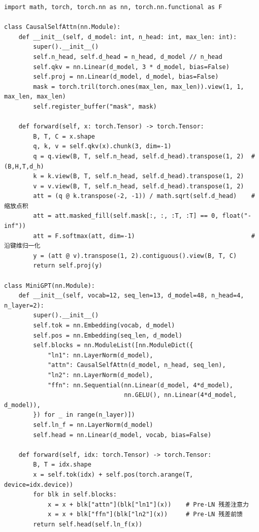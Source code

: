 \begin{lstlisting}[caption={纯 PyTorch 手写因果多头自注意力与 Pre-LN 迷你 GPT（与 \texttt{vol5\_experiments.py} 一致）},label={lst:minigpt}]
import math, torch, torch.nn as nn, torch.nn.functional as F

class CausalSelfAttn(nn.Module):
    def __init__(self, d_model: int, n_head: int, max_len: int):
        super().__init__()
        self.n_head, self.d_head = n_head, d_model // n_head
        self.qkv = nn.Linear(d_model, 3 * d_model, bias=False)
        self.proj = nn.Linear(d_model, d_model, bias=False)
        mask = torch.tril(torch.ones(max_len, max_len)).view(1, 1, max_len, max_len)
        self.register_buffer("mask", mask)

    def forward(self, x: torch.Tensor) -> torch.Tensor:
        B, T, C = x.shape
        q, k, v = self.qkv(x).chunk(3, dim=-1)
        q = q.view(B, T, self.n_head, self.d_head).transpose(1, 2)  # (B,H,T,d_h)
        k = k.view(B, T, self.n_head, self.d_head).transpose(1, 2)
        v = v.view(B, T, self.n_head, self.d_head).transpose(1, 2)
        att = (q @ k.transpose(-2, -1)) / math.sqrt(self.d_head)    # 缩放点积
        att = att.masked_fill(self.mask[:, :, :T, :T] == 0, float("-inf"))
        att = F.softmax(att, dim=-1)                                # 沿键维归一化
        y = (att @ v).transpose(1, 2).contiguous().view(B, T, C)
        return self.proj(y)

class MiniGPT(nn.Module):
    def __init__(self, vocab=12, seq_len=13, d_model=48, n_head=4, n_layer=2):
        super().__init__()
        self.tok = nn.Embedding(vocab, d_model)
        self.pos = nn.Embedding(seq_len, d_model)
        self.blocks = nn.ModuleList([nn.ModuleDict({
            "ln1": nn.LayerNorm(d_model),
            "attn": CausalSelfAttn(d_model, n_head, seq_len),
            "ln2": nn.LayerNorm(d_model),
            "ffn": nn.Sequential(nn.Linear(d_model, 4*d_model),
                                 nn.GELU(), nn.Linear(4*d_model, d_model)),
        }) for _ in range(n_layer)])
        self.ln_f = nn.LayerNorm(d_model)
        self.head = nn.Linear(d_model, vocab, bias=False)

    def forward(self, idx: torch.Tensor) -> torch.Tensor:
        B, T = idx.shape
        x = self.tok(idx) + self.pos(torch.arange(T, device=idx.device))
        for blk in self.blocks:
            x = x + blk["attn"](blk["ln1"](x))    # Pre-LN 残差注意力
            x = x + blk["ffn"](blk["ln2"](x))     # Pre-LN 残差前馈
        return self.head(self.ln_f(x))
\end{lstlisting}


